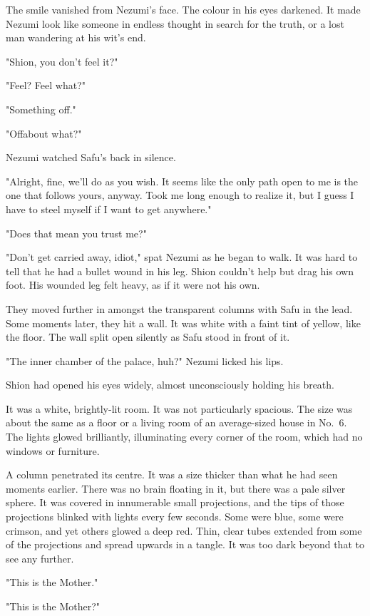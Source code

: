 The smile vanished from Nezumi's face. The colour in his eyes darkened.
It made Nezumi look like someone in endless thought in search for the
truth, or a lost man wandering at his wit's end.

"Shion, you don't feel it?"

"Feel? Feel what?"

"Something off."

"Off\el about what?"

Nezumi watched Safu's back in silence.

"Alright, fine, we'll do as you wish. It seems like the only path open
to me is the one that follows yours, anyway. Took me long enough to
realize it, but I guess I have to steel myself if I want to get
anywhere."

"Does that mean you trust me?"

"Don't get carried away, idiot," spat Nezumi as he began to walk. It was
hard to tell that he had a bullet wound in his leg. Shion couldn't help
but drag his own foot. His wounded leg felt heavy, as if it were not his
own.

They moved further in amongst the transparent columns with Safu in the
lead. Some moments later, they hit a wall. It was white with a faint
tint of yellow, like the floor. The wall split open silently as Safu
stood in front of it.

"The inner chamber of the palace, huh?" Nezumi licked his lips.

Shion had opened his eyes widely, almost unconsciously holding his
breath.

It was a white, brightly-lit room. It was not particularly spacious. The
size was about the same as a floor or a living room of an average-sized
house in No.~6. The lights glowed brilliantly, illuminating every corner
of the room, which had no windows or furniture.

A column penetrated its centre. It was a size thicker than what he had
seen moments earlier. There was no brain floating in it, but there was a
pale silver sphere. It was covered in innumerable small projections, and
the tips of those projections blinked with lights every few seconds.
Some were blue, some were crimson, and yet others glowed a deep red.
Thin, clear tubes extended from some of the projections and spread
upwards in a tangle. It was too dark beyond that to see any further.

"This is the Mother."

"This is the Mother?"

